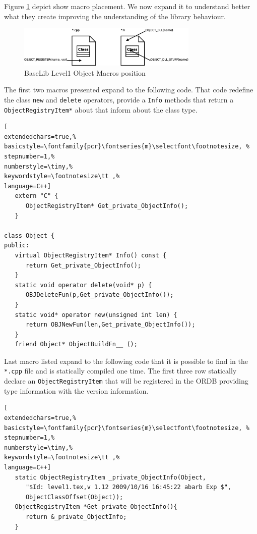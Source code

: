 Figure \ref{f:level1:object_macro} depict show macro placement. We now expand it to understand better what they create improving the understanding of the library behaviour.

\begin{figure}[h!]
 \begin{center}
  \includegraphics[width=0.77\textwidth]{level1/objectMacros.eps}
  \caption{BaseLib Level1 Object Macros position}
  \label{f:level1:object_macro}
 \end{center}
\end{figure}

The first two macros presented expand to the following code. That code redefine the class \texttt{new} and \texttt{delete} operators, provide a \texttt{Info} methods that return a \texttt{ObjectRegistryItem*} about that inform about the class type.

\begin{lstlisting}[
extendedchars=true,%
basicstyle=\fontfamily{pcr}\fontseries{m}\selectfont\footnotesize, %
stepnumber=1,%
numberstyle=\tiny,%
keywordstyle=\footnotesize\tt ,%
language=C++]
   extern "C" {
      ObjectRegistryItem* Get_private_ObjectInfo();
   }

class Object {
public:
   virtual ObjectRegistryItem* Info() const {
      return Get_private_ObjectInfo();
   }
   static void operator delete(void* p) {
      OBJDeleteFun(p,Get_private_ObjectInfo());
   }
   static void* operator new(unsigned int len) {
      return OBJNewFun(len,Get_private_ObjectInfo());
   }
   friend Object* ObjectBuildFn__ ();
\end{lstlisting}

Last macro listed expand to the following code that it is possible to find in the \texttt{*.cpp} file and is statically compiled one time. The first three row statically declare an \texttt{ObjectRegistryItem} that will be registered in the ORDB providing type information with the version information.

\begin{lstlisting}[
extendedchars=true,%
basicstyle=\fontfamily{pcr}\fontseries{m}\selectfont\footnotesize, %
stepnumber=1,%
numberstyle=\tiny,%
keywordstyle=\footnotesize\tt ,%
language=C++]
   static ObjectRegistryItem _private_ObjectInfo(Object,
      "$Id: level1.tex,v 1.12 2009/10/16 16:45:22 abarb Exp $",
      ObjectClassOffset(Object));
   ObjectRegistryItem *Get_private_ObjectInfo(){
      return &_private_ObjectInfo;
   }
\end{lstlisting}

